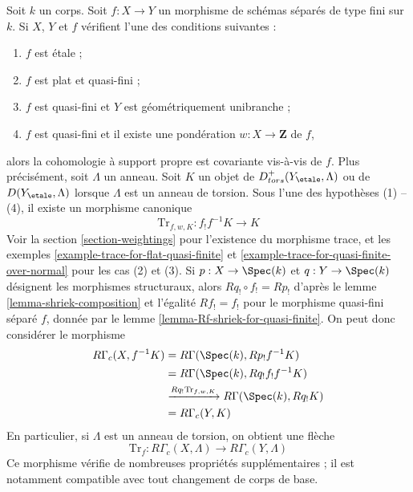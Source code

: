 \begin{remark}
\label{remark-covariance-compactly-supported}
Soit $k$ un corps. Soit $f : X \to Y$ un morphisme de schémas séparés
de type fini sur $k$. Si $X$, $Y$ et $f$ vérifient l'une
des conditions suivantes :
\begin{enumerate}
\item $f$ est étale ;
\item $f$ est plat et quasi-fini ;
\item $f$ est quasi-fini et $Y$ est géométriquement unibranche ;
\item $f$ est quasi-fini et il existe une pondération
$w : X \to \mathbf{Z}$ de $f$,
\end{enumerate}
alors la cohomologie à support propre est covariante vis-à-vis de $f$.
Plus précisément, soit $\Lambda$ un anneau. Soit $K$ un objet de
$D^+_{tors}(Y_\etale, \Lambda)$ ou de $D(Y_\etale, \Lambda)$ lorsque
$\Lambda$ est un anneau de torsion. Sous l'une des hypothèses (1) -- (4),
il existe un morphisme canonique
$$
\text{Tr}_{f, w, K} : f_!f^{-1}K \longrightarrow K
$$
Voir la section \ref{section-weightings} pour l'existence du
morphisme trace, et les exemples \ref{example-trace-for-flat-quasi-finite} et
\ref{example-trace-for-quasi-finite-over-normal} pour les cas (2) et (3).
Si $p : X \to \Spec(k)$ et $q : Y \to \Spec(k)$ désignent
les morphismes structuraux, alors $Rq_! \circ f_! = Rp_!$
d'après le lemme \ref{lemma-shriek-composition} et l'égalité
$Rf_! = f_!$ pour le morphisme quasi-fini séparé $f$, donnée par le
lemme \ref{lemma-Rf-shriek-for-quasi-finite}. On peut donc considérer
le morphisme
\begin{align*}
R\Gamma_c(X, f^{-1}K)
& =
R\Gamma(\Spec(k), Rp_!f^{-1}K) \\
& =
R\Gamma(\Spec(k), Rq_!f_!f^{-1}K) \\
& \xrightarrow{Rq_!\text{Tr}_{f, w, K}}
R\Gamma(\Spec(k), Rq_!K) \\
& =
R\Gamma_c(Y, K)
\end{align*}
En particulier, si $\Lambda$ est un anneau de torsion, on obtient une flèche
$$
\text{Tr}_f : R\Gamma_c(X, \Lambda) \longrightarrow R\Gamma_c(Y, \Lambda)
$$
Ce morphisme vérifie de nombreuses propriétés supplémentaires ; il est notamment
compatible avec tout changement de corps de base.
\end{remark}










